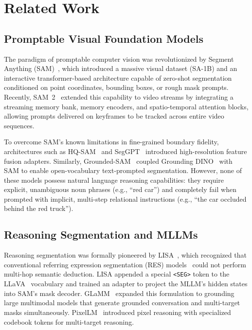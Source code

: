 \documentclass[10pt,twocolumn,letterpaper]{article}
\begin{document}
\section{Related Work}
\label{sec:related}

\subsection{Promptable Visual Foundation Models}
The paradigm of promptable computer vision was revolutionized by Segment Anything (SAM)~\cite{kirillov2023sam}, which introduced a massive visual dataset (SA-1B) and an interactive transformer-based architecture capable of zero-shot segmentation conditioned on point coordinates, bounding boxes, or rough mask prompts. Recently, SAM~2~\cite{ravi2024sam2} extended this capability to video streams by integrating a streaming memory bank, memory encoders, and spatio-temporal attention blocks, allowing prompts delivered on keyframes to be tracked across entire video sequences. 

To overcome SAM's known limitations in fine-grained boundary fidelity, architectures such as HQ-SAM~\cite{ke2024segment} and SegGPT~\cite{wang2023seggpt} introduced high-resolution feature fusion adapters. Similarly, Grounded-SAM~\cite{liu2023grounding} coupled Grounding DINO~\cite{liu2023grounding} with SAM to enable open-vocabulary text-prompted segmentation. However, none of these models possess natural language reasoning capabilities: they require explicit, unambiguous noun phrases (e.g., ``red car'') and completely fail when prompted with implicit, multi-step relational instructions (e.g., ``the car occluded behind the red truck'').

\subsection{Reasoning Segmentation and MLLMs}
Reasoning segmentation was formally pioneered by LISA~\cite{lai2023lisa}, which recognized that conventional referring expression segmentation (RES) models~\cite{hu2016natural,kazemzadeh2014referitgame} could not perform multi-hop semantic deduction. LISA appended a special \texttt{<SEG>} token to the LLaVA~\cite{liu2024visual} vocabulary and trained an adapter to project the MLLM's hidden states into SAM's mask decoder. GLaMM~\cite{rasheed2024glamm} expanded this formulation to grounding large multimodal models that generate grounded conversation and multi-target masks simultaneously. PixelLM~\cite{ren2024pixellm} introduced pixel reasoning with specialized codebook tokens for multi-target reasoning.
\end{document}

